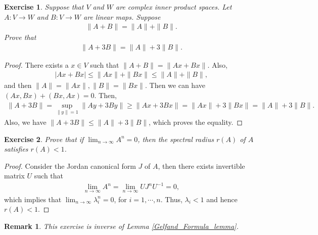 \documentclass[11pt]{book}
\newtheorem{exercise}{Exercise}[section]
\newtheorem{remark}{Remark}[section]
\theoremstyle{definition}
\numberwithin{equation}{chapter}
\begin{document}
\medskip

\begin{exercise}
Suppose that $V$ and $W$ are complex inner product spaces. Let $A: V \to W$ and $B:V \to W$ are linear maps. Suppose 
\begin{align*}
    \|A + B\| = \|A\| + \|B\|.
\end{align*}
Prove that
\begin{align*}
    \|A + 3B\| = \|A\| + 3\|B\|.
\end{align*}
\end{exercise}
\begin{proof}
There exists a $x \in V$ such that $\|A + B\| = \|Ax + Bx\|$. Also,
\begin{align*}
    |Ax + Bx| \leq \|Ax\| + \|Bx\| \leq \|A\| + \|B\|,
\end{align*}
and then $\|A\| = \|Ax\|, \|B\| = \|Bx\|$. Then we can have $(Ax, Bx) + (Bx, Ax) = 0$. Then,
\begin{align*}
    \|A + 3B\| = \sup_{\|y\| = 1}\|Ay + 3By\| \geq \|Ax + 3Bx\| = \|Ax\| + 3\|Bx\| = \|A\| + 3 \|B\|.
\end{align*}
Also, we have $\|A + 3B\| \leq \|A\| + 3 \|B\|$, which proves the equality.
\end{proof}

\medskip

\begin{exercise}
Prove that if $\lim_{n\to\infty} A^n = 0$, then the spectral radius $r(A)$ of $A$ satisfies $r(A) < 1$.
\end{exercise}
\begin{proof}
Consider the Jordan canonical form $J$ of $A$, then there exists invertible matrix $U$ such that 
\begin{align*}
    \lim_{n \to \infty} A^n = \lim_{n \to \infty} U J^n U^{-1} = 0,
\end{align*}
which implies that $\lim_{n \to \infty} \lambda_i^n = 0$, for $i = 1, \cdots, n$. Thus, $\lambda_i < 1$ and hence $r(A) < 1$.
\end{proof}

\begin{remark}
This exercise is inverse of Lemma \ref{Gelfand_Formula_lemma}.
\end{remark}

\medskip
\end{document}
